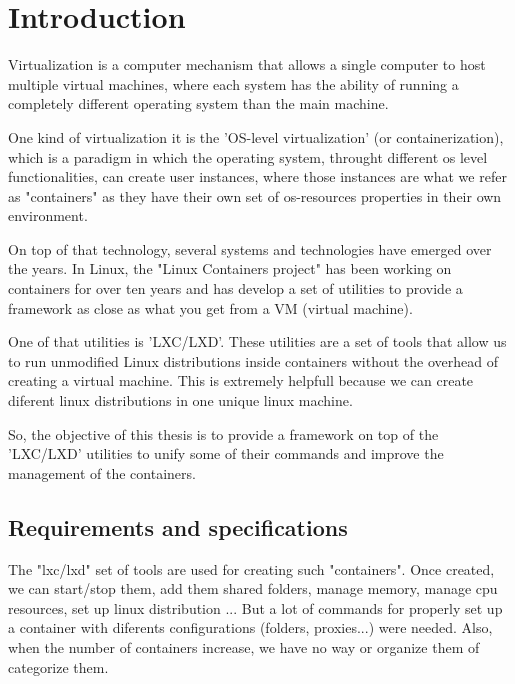 \clearpage\section{Introduction}

Virtualization is a computer mechanism that allows a single computer to host multiple virtual machines, where each system has the ability of running a completely different operating system than the main machine. 

One kind of virtualization it is the 'OS-level virtualization' (or containerization), which is a paradigm in which the operating system, throught different os level functionalities, can create user instances, where those instances are what we refer as "containers" as they have their own set of os-resources properties in their own environment.

On top of that technology, several systems and technologies have emerged over the years. In Linux, the "Linux Containers project" has been working on containers for over ten years and has develop a set of utilities to provide a framework as close as what you get from a VM (virtual machine). 

One of that utilities is 'LXC/LXD'. These utilities are a set of tools that allow us to run unmodified Linux distributions inside containers without the overhead of creating a virtual machine. This is extremely helpfull because we can create diferent linux distributions in one unique linux machine.

So, the objective of this thesis is to provide a framework on top of the 'LXC/LXD' utilities to unify some of their commands and improve the management of the containers.

\bigskip

\subsection{Requirements and specifications}
\label{ssec:requirements}
The "lxc/lxd" set of tools are used for creating such "containers". Once created, we can start/stop them, add them shared folders, manage memory, manage cpu resources, set up linux distribution ...
But a lot of commands for properly set up a container with diferents configurations (folders, proxies...) were needed. Also, when the number of containers increase, we have no way or organize them of categorize them.

